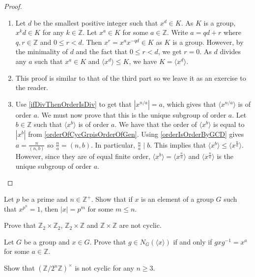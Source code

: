 \begin{proof}
    \phantom{beegyoshi}
    \begin{enumerate}
        \item Let $d$ be the smallest positive integer such that $x^d\in K$. As $K$ is a group, $x^kd\in K$ for any $k\in\mathbb{Z}$. Let $x^a\in K$ for some $a\in\mathbb{Z}$. Write $a=qd+r$ where $q,r\in\mathbb{Z}$ and $0\leq r<d$. Then $x^r=x^{a}x^{-qd}\in K$ as $K$ is a group. However, by the minimality of $d$ and the fact that $0\leq r<d$, we get $r=0$. As $d$ divides any $a$ such that $x^a\in K$ and $\langle x^d\rangle\leq K$, we have $K=\langle x^d\rangle$.
        \item This proof is similar to that of the third part so we leave it as an exercise to the reader.
        \item Use \ref{ifDivThenOrderIsDiv} to get that $|x^{n/a}|=a$, which gives that $\langle x^{n/a}\rangle$ is of order $a$. We must now prove that this is the unique subgroup of order $a$. Let $b\in\mathbb{Z}$ such that $\langle x^b\rangle$ is of order $a$. We have that the order of $\langle x^b\rangle$ is equal to $|x^b|$ from \ref{orderOfCycGrpisOrderOfGen}. Using \ref{orderIsOrderByGCD} gives $a=\frac{n}{(n,b)}$ so $\frac na=(n,b)$. In particular, $\frac na\mid b$. This implies that $\langle x^b\rangle\leq\langle x^\frac{n}{a}\rangle$. However, since they are of equal finite order, $\langle x^b\rangle=\langle x^\frac{n}{a}\rangle$ and $\langle x^\frac{n}{a}\rangle$ is the unique subgroup of order $a$. 
    \end{enumerate}
\end{proof}

\begin{exercise}
    Let $p$ be a prime and $n\in\mathbb{Z}^+$. Show that if $x$ is an element of a group $G$ such that $x^{p^n}=1$, then $|x|=p^m$ for some $m\leq n$.
\end{exercise}

\begin{exercise}
    Prove that $\mathbb{Z}_2\times\mathbb{Z}_2$, $\mathbb{Z}_2\times\mathbb{Z}$ and $\mathbb{Z}\times\mathbb{Z}$ are not cyclic.
\end{exercise}

\begin{exercise}
    Let $G$ be a group and $x\in G$. Prove that $g\in N_G(\langle x\rangle)$ if and only if $gxg^{-1}=x^a$ for some $a\in\mathbb{Z}$.
\end{exercise}

\begin{exercise}
    Show that $(\mathbb{Z}/2^n\mathbb{Z})^\times$ is not cyclic for any $n\geq 3$.
\end{exercise}

